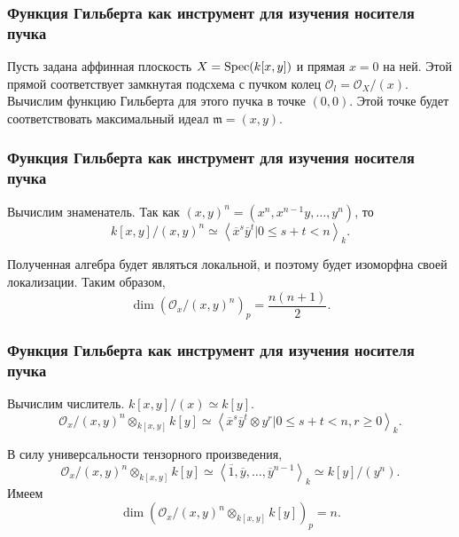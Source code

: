 \documentclass{beamer}
\newcommand{\ox}{\otimes}
\newcommand{\OO}{\mathcal{O}}
\newcommand{\spec}[1]{\textup{Spec}(#1)}
\renewcommand{\bar}[1]{\overline{#1}}
\renewcommand{\geq}{\geqslant}
\renewcommand{\leq}{\leqslant}
\begin{document}
    

    \begin{frame}
        \frametitle{Функция Гильберта как инструмент для изучения носителя пучка}

        Пусть задана аффинная плоскость $X = \spec{k[x, y]}$ и прямая $x = 0$ на ней. Этой прямой соответствует замкнутая подсхема
        с пучком колец $\OO_l = \OO_X / (x)$. Вычислим функцию Гильберта для этого пучка в точке $(0, 0)$.
        Этой точке будет соответствовать максимальный идеал $\mathfrak{m} = (x, y)$.
    \end{frame}

    \begin{frame}
        \frametitle{Функция Гильберта как инструмент для изучения носителя пучка}

        Вычислим знаменатель. Так как $(x, y)^n = (x^n, x^{n - 1}y, \dots, y^n)$, то
        \begin{equation*}
            k[x, y] / (x, y)^n \simeq \left< \bar{x}^s\bar{y}^t | 0 \leq s + t < n \right>_k.
        \end{equation*}

        Полученная алгебра будет являться локальной, и поэтому будет изоморфна своей локализации.
        Таким образом,
        \begin{equation*}
            \dim (\OO_x / (x, y)^n)_p = \frac{n(n + 1)}{2}.
        \end{equation*}
    \end{frame}

    \begin{frame}
        \frametitle{Функция Гильберта как инструмент для изучения носителя пучка}

        Вычислим числитель. $k[x, y] / (x) \simeq k[y]$.
        \begin{equation*}
            \OO_x / (x, y)^n \ox_{k[x, y]} k[y] \simeq \left< \bar{x}^s\bar{y}^t \ox y^r | 0 \leq s + t < n, r \geq 0 \right>_k.
        \end{equation*}

        В силу универсальности тензорного произведения, 
        \begin{equation*}
            \OO_x / (x, y)^n \ox_{k[x, y]} k[y] \simeq \left<\bar{1}, \bar{y}, \dots, \bar{y}^{n-1} \right>_k \simeq k[y] / (y^n).
        \end{equation*}
        Имеем
        \begin{equation*}
            \dim (\OO_x / (x, y)^n \ox_{k[x, y] }k[y])_p = n.
        \end{equation*}
    \end{frame}
\end{document}
